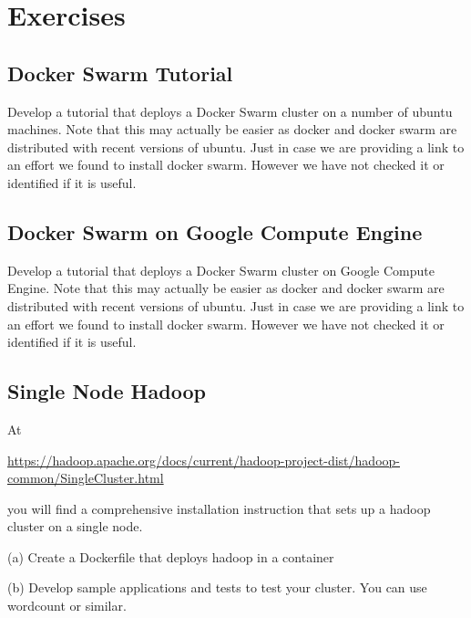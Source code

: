 

\chapter{Exercises}

\section{Docker Swarm Tutorial}

\begin{exercise}

  Develop a tutorial that deploys a Docker Swarm cluster on a number
  of ubuntu machines. Note that this may actually be easier as docker
  and docker swarm are distributed with recent versions of
  ubuntu. Just in case we are providing a link to an effort we found
  to install docker swarm. However we have not checked it or
  identified if it is useful.
 

\end{exercise}


\section{Docker Swarm on Google Compute Engine}

\begin{exercise}
  Develop a tutorial that deploys a Docker Swarm cluster on Google
  Compute Engine. Note that this may actually be easier as docker
  and docker swarm are distributed with recent versions of
  ubuntu. Just in case we are providing a link to an effort we found
  to install docker swarm. However we have not checked it or
  identified if it is useful.


\end{exercise}

\section{Single Node Hadoop}

\begin{exercise}

At

\url{https://hadoop.apache.org/docs/current/hadoop-project-dist/hadoop-common/SingleCluster.html}

you will find a comprehensive installation instruction that sets up a
hadoop cluster on a single node. 

(a) Create a Dockerfile that deploys hadoop in a container

(b) Develop sample applications and tests to test your cluster. You
can use wordcount or similar.

\end{exercise}


